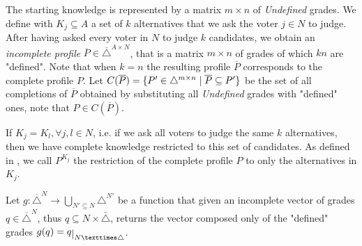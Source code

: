 \documentclass[version=3.21, pagesize, twoside=off, bibliography=totoc, DIV=calc, fontsize=12pt, a4paper]{scrartcl}
\begin{document}
The starting knowledge is represented by a matrix $m\times n$ of \textit{Undefined} grades. We define with $K_j \subseteq A$ a set of $k$ alternatives that we ask the voter $j\in N$ to judge. 
After having asked every voter in $N$ to judge $k$ candidates, we obtain an \emph{incomplete profile} $\overline{P}\in \overline{\triangle}^{A \times N}$, that is a matrix $m \times n$ of grades of which $kn$ are "defined".
Note that when $k=n$ the resulting profile $\overline{P}$ corresponds to the complete profile $P$. Let $C(\overline{P}) = \{P' \in \triangle^{m \times n} \suchthat \overline{P} \subseteq P'\}$ be the set of all completions of $\overline{P}$ obtained by substituting all \emph{Undefined} grades with "defined" ones, note that $P \in C(\overline{P})$.
 
If $K_j=K_l, \forall j,l\in N$, i.e. 
if we ask all voters to judge the same $k$ alternatives, then we have complete knowledge restricted to this set of candidates. As defined in , we call $P^{K_j}$ the restriction of the complete profile $P$ to only the alternatives in $K_j$.

Let $g:\overline{\triangle}^N\rightarrow \bigcup_{N' \subseteq N}\triangle^{N'}$ be a function that given an incomplete vector of grades $q \in \overline{\triangle}^N$, thus $q \subseteq N × \bar{\triangle}$, returns the vector composed only of the "defined" grades $g(q) = \restr{q}{N × \triangle}$.

\end{document}
